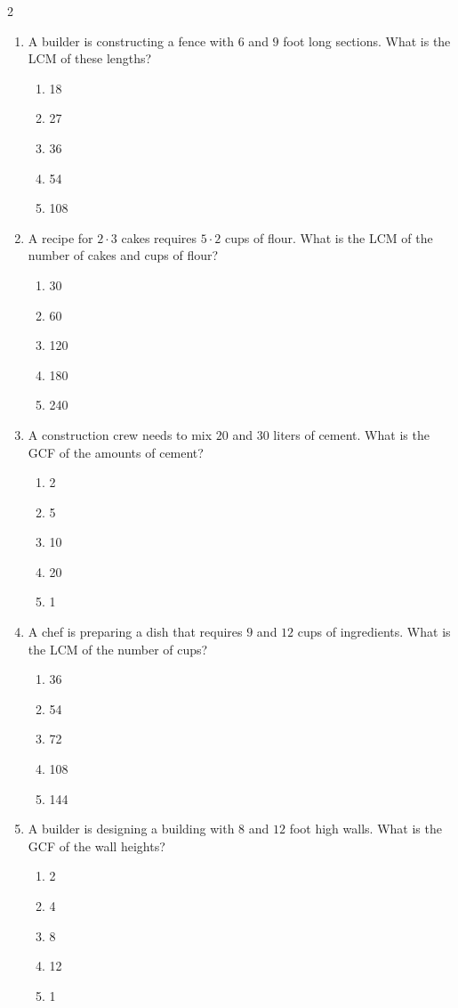 \documentclass[10pt]{article}
\begin{document}
\begin{multicols}{2}
\begin{enumerate}[label=\textbf{Q\arabic*.}, leftmargin=*, itemsep=6pt, parsep=0pt]
  \item \small A builder is constructing a fence with $6$ and $9$ foot long sections. What is the LCM of these lengths?
  \begin{enumerate}[label=(\Alph*), leftmargin=0.6cm, nosep, itemsep=2pt]
    \item 18
    \item 27
    \item 36
    \item 54
    \item 108
  \end{enumerate}

  \item \small A recipe for $2 \cdot 3$ cakes requires $5 \cdot 2$ cups of flour. What is the LCM of the number of cakes and cups of flour?
  \begin{enumerate}[label=(\Alph*), leftmargin=0.6cm, nosep, itemsep=2pt]
    \item 30
    \item 60
    \item 120
    \item 180
    \item 240
  \end{enumerate}

  \item \small A construction crew needs to mix $20$ and $30$ liters of cement. What is the GCF of the amounts of cement?
  \begin{enumerate}[label=(\Alph*), leftmargin=0.6cm, nosep, itemsep=2pt]
    \item 2
    \item 5
    \item 10
    \item 20
    \item 1
  \end{enumerate}

  \item \small A chef is preparing a dish that requires $9$ and $12$ cups of ingredients. What is the LCM of the number of cups?
  \begin{enumerate}[label=(\Alph*), leftmargin=0.6cm, nosep, itemsep=2pt]
    \item 36
    \item 54
    \item 72
    \item 108
    \item 144
  \end{enumerate}

  \item \small A builder is designing a building with $8$ and $12$ foot high walls. What is the GCF of the wall heights?
  \begin{enumerate}[label=(\Alph*), leftmargin=0.6cm, nosep, itemsep=2pt]
    \item 2
    \item 4
    \item 8
    \item 12
    \item 1
  \end{enumerate}


\end{enumerate}
\end{multicols}
\end{document}
